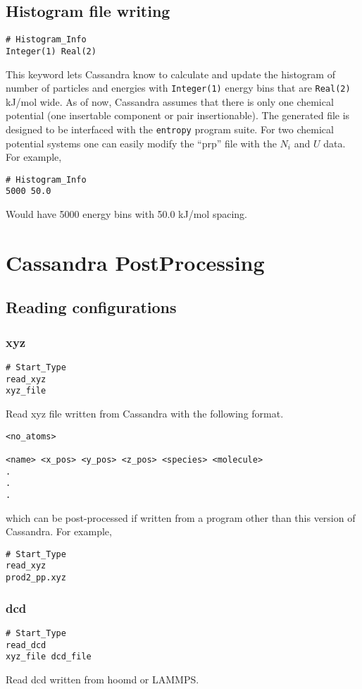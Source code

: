 \documentclass[12pt,twoside]{article}
\begin{document}
\subsection{Histogram file writing}
\begin{verbatim}
# Histogram_Info
Integer(1) Real(2)
\end{verbatim}
This keyword lets Cassandra know to calculate and update the histogram of number of particles and energies with \texttt{Integer(1)} energy bins that are \texttt{Real(2)} kJ/mol wide. As of now, Cassandra assumes that there is only one chemical potential (one insertable component or pair insertionable). The generated file is designed to be interfaced with the \texttt{entropy} program suite. For two chemical potential systems one can easily modify the ``prp'' file with the $N_i$ and $U$ data.
\newline\noindent For example,
\begin{verbatim}
# Histogram_Info
5000 50.0
\end{verbatim}
Would have 5000 energy bins with 50.0 kJ/mol spacing.

\section{Cassandra PostProcessing}

\subsection{Reading configurations}
\subsubsection{xyz}
\begin{verbatim}
# Start_Type
read_xyz
xyz_file
\end{verbatim}
Read xyz file written from Cassandra with the following format.
\begin{verbatim}
<no_atoms>

<name> <x_pos> <y_pos> <z_pos> <species> <molecule>
.
.
.
\end{verbatim}
which can be post-processed if written from a program other than this version of Cassandra.
\newline\noindent For example,
\begin{verbatim}
# Start_Type
read_xyz
prod2_pp.xyz
\end{verbatim}

\subsubsection{dcd}
\begin{verbatim}
# Start_Type
read_dcd
xyz_file dcd_file
\end{verbatim}
Read dcd written from hoomd or LAMMPS.
\end{document}
